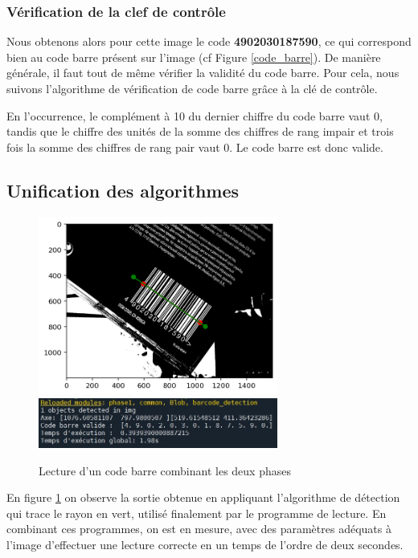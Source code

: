 \documentclass{rapport}
\begin{document}
\subsubsection*{Vérification de la clef de contrôle}
Nous obtenons alors pour cette image le code \textbf{4902030187590}, ce qui correspond bien au code barre présent sur l'image (cf Figure \ref{code_barre}).
De manière générale, il faut tout de même vérifier la validité du code barre. Pour cela, nous suivons l'algorithme de vérification de code barre grâce à la clé de contrôle.

En l'occurrence, le complément à 10 du dernier chiffre du code barre vaut 0, tandis que le chiffre des unités de la somme des chiffres de rang impair et trois fois la somme des chiffres de rang pair vaut 0. 
Le code barre est donc valide.

\subsection{Unification des algorithmes}

\begin{figure}[H] 
	\begin{center}
    \includegraphics[width=0.7\textwidth]{images/Detection/lecture2.png}
	\includegraphics[width=0.7\textwidth]{images/Detection/lecture.jpg}
	\caption{Lecture d'un code barre combinant les deux phases}
	\label{fig:finalres}
    	\end{center}
\end{figure}
En figure \ref{fig:finalres} on observe la sortie obtenue en appliquant l'algorithme de détection qui trace le rayon en vert, utilisé finalement par le programme de lecture.
\newline En combinant ces programmes, on est en mesure, avec des paramètres adéquats à l'image d'effectuer une lecture correcte en un temps de l'ordre de deux secondes.
\end{document}
